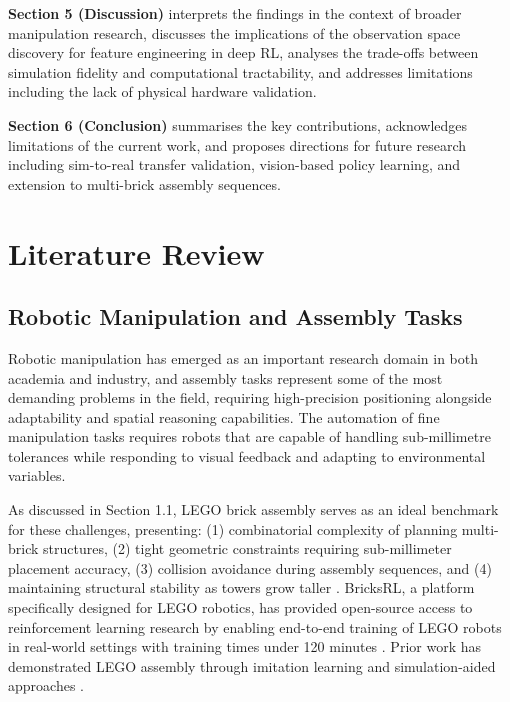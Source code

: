 \documentclass[12pt,a4paper,oneside]{report}
\begin{document}
\textbf{Section 5 (Discussion)} interprets the findings in the context of broader manipulation research, discusses the implications of the observation space discovery for feature engineering in deep RL, analyses the trade-offs between simulation fidelity and computational tractability, and addresses limitations including the lack of physical hardware validation.

\textbf{Section 6 (Conclusion)} summarises the key contributions, acknowledges limitations of the current work, and proposes directions for future research including sim-to-real transfer validation, vision-based policy learning, and extension to multi-brick assembly sequences.

\chapter{Literature Review}

\section{Robotic Manipulation and Assembly Tasks}

Robotic manipulation has emerged as an important research domain in both academia and industry, and assembly tasks represent some of the most demanding problems in the field, requiring high-precision positioning alongside adaptability and spatial reasoning capabilities. The automation of fine manipulation tasks requires robots that are capable of handling sub-millimetre tolerances while responding to visual feedback and adapting to environmental variables\cite{chengZeroshotSimtorealTransfer2023, TrendsChallengesRobot2019, nguyenLearningFrameworkHigh2019}.

As discussed in Section 1.1, LEGO brick assembly serves as an ideal benchmark for these challenges, presenting: (1) combinatorial complexity of planning multi-brick structures, (2) tight geometric constraints requiring sub-millimeter placement accuracy, (3) collision avoidance during assembly sequences, and (4) maintaining structural stability as towers grow taller \cite{chengZeroshotSimtorealTransfer2023, ghasemipourBlocksAssembleLearning2022}. BricksRL, a platform specifically designed for LEGO robotics, has provided open-source access to reinforcement learning research by enabling end-to-end training of LEGO robots in real-world settings with training times under 120 minutes \cite{mitashBricksRLPlatformDemocratizing2024}. Prior work has demonstrated LEGO assembly through imitation learning and simulation-aided approaches \cite{liuRoboticLEGOAssembly2023, liuSimulationaidedLearningDemonstration2023}.
\end{document}
